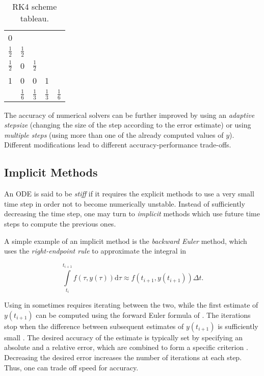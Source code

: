 \begin{table}
  \centering
  \caption{\ac{RK}4 scheme tableau.}
  \bgroup
  \def\arraystretch{1.5}%
  \begin{tabular}{c | c c c c}
    0 & & & &\\
    $\frac{1}{2}$ & $\frac{1}{2}$ & & &\\
    $\frac{1}{2}$ & 0 & $\frac{1}{2}$ & &\\
    1 & 0 & 0 & 1 &\\ \hline
      & $\frac{1}{6}$ & $\frac{1}{3}$ & $\frac{1}{3}$ & $\frac{1}{6}$ \\    
  \end{tabular}
  \egroup
  \label{tab:rk4_tableau}
\end{table}

The accuracy of numerical solvers can be further improved by using an \emph{adaptive stepsize} (changing the size of the step according to the error estimate) or using \emph{multiple steps} (using more than one of the already computed values of $y$). Different modifications lead to different accuracy-performance trade-offs.

\subsection{Implicit Methods}
\label{subsection:stiffness}

An \ac{ODE} is said to be \emph{stiff} if it requires the explicit methods to use a very small time step in order not to become numerically unstable. Instead of sufficiently decreasing the time step, one may turn to \emph{implicit} methods which use future time steps to compute the previous ones.

A simple example of an implicit method is the \emph{backward Euler} method, which uses the \emph{right-endpoint rule} to approximate the integral in  \cite{Gockenbach2011}

\begin{equation}
    \int \limits_{t_i}^{t_{i+1}} f(\tau, y(\tau)) \mathrm{d} \tau \approx f(t_{i+1}, y(t_{i+1}))\Delta t.
  \label{eq:backward_euler}
\end{equation}

Using  in  sometimes requires iterating between the two, while the first estimate of $y(t_{i+1})$ can be computed using the forward Euler formula of . The iterations stop when the difference between subsequent estimates of $y(t_{i+1})$ is sufficiently small \cite{Yeh2007}. The desired accuracy of the estimate is typically set by specifying an absolute and a relative error, which are combined to form a specific criterion \cite{SciPy}. Decreasing the desired error increases the number of iterations at each step. Thus, one can trade off speed for accuracy.

